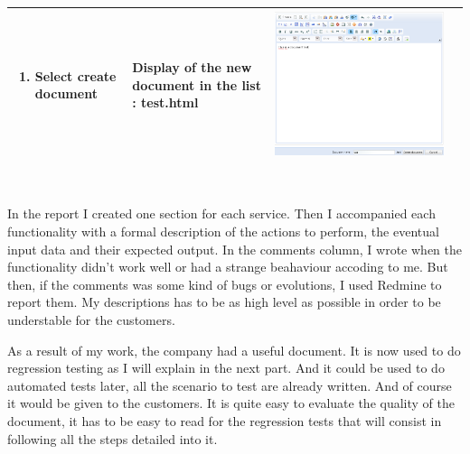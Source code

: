 \begin{itemize}
\begin{tabular}{|m{4cm}|m{3cm}|m{4cm}|m{2.1cm}|}
\begin{enumerate}
	\item Select create document 
\end{enumerate}&
Display of the new document in the list : test.html & 
\begin{minipage}{0.7\textwidth}
\includegraphics[scale=0.15]{Images/document.png} 
\end{minipage}& 
\\
\hline
\end{tabular}
\\
\end{itemize}

In the report I created one section for each service. Then I accompanied 
each functionality with a formal description of the actions to perform, 
the eventual input data and their expected output. In the comments column, I wrote when the
functionality didn't work well or had a strange beahaviour accoding to me. But then, 
if the comments was some kind of bugs or evolutions, I used Redmine to report them.  
My descriptions has to be as high level as possible in order to be understable for the customers. 

As a result of my work, the company had a useful document. It is now used to do regression
testing as I will explain in the next part. And it could be used to do automated tests later,
 all the scenario to test are already written. And of course it would be given to the customers.
It is quite easy to evaluate the quality of the document, it has to be easy to read for
the regression tests that will consist in following all the steps detailed into it.\\



